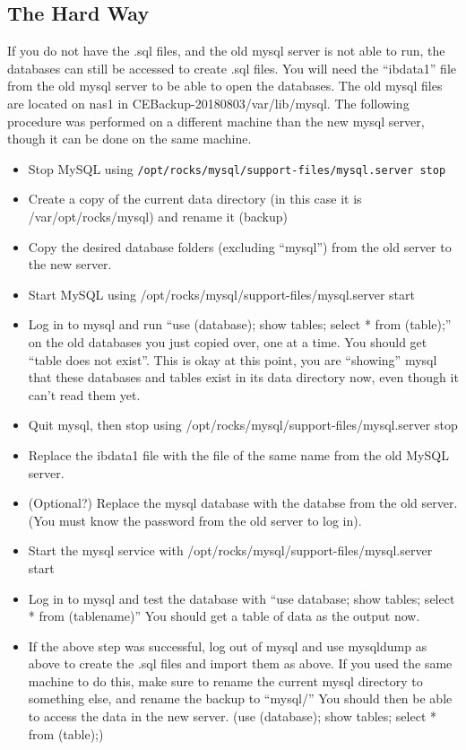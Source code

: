 \documentclass[12pt]{article}
\begin{document}
\subsection{The Hard Way}
If you do not have the .sql files, and the old mysql server is not able to run, the databases can still be accessed to create .sql files. You will need the ``ibdata1'' file from the old mysql server to be able to open the databases. The old mysql files are located on nas1 in CEBackup-20180803/var/lib/mysql. 
The following procedure was performed on a different machine than the new mysql server, though it can be done on the same machine.
\begin{itemize}
\item Stop MySQL using {\tt /opt/rocks/mysql/support-files/mysql.server stop}
\item Create a copy of the current data directory (in this case it is /var/opt/rocks/mysql) and rename it (backup)
\item Copy the desired database folders (excluding ``mysql'') from the old server to the new server.
\item Start MySQL using /opt/rocks/mysql/support-files/mysql.server start
\item Log in to mysql and run ``use (database); show tables; select * from (table);'' on the old databases you just copied over, one at a time. You should get ``table does not exist''. This is okay at this point, you are ``showing'' mysql that these databases and tables exist in its data directory now, even though it can't read them yet. 
\item Quit mysql, then stop using /opt/rocks/mysql/support-files/mysql.server stop
\item Replace the ibdata1 file with the file of the same name from the old MySQL server.
\item (Optional?) Replace the mysql database with the databse from the old server. (You must know the password from the old server to log in). 
\item Start the mysql service with /opt/rocks/mysql/support-files/mysql.server start
\item Log in to mysql and test the database with ``use database; show tables; select * from (tablename)'' You should get a table of data as the output now.
\item If the above step was successful, log out of mysql and use mysqldump as above to create the .sql files and import them as above. If you used the same machine to do this, make sure to rename the current mysql directory to something else, and rename the backup to ``mysql/''
  You should then be able to access the data in the new server. (use (database); show tables; select * from (table);)
\end{itemize}
\end{document}
